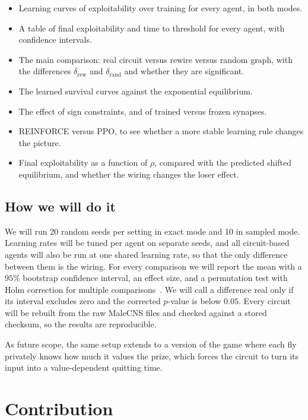 \documentclass{article}
\begin{document}
\begin{itemize}
  \item Learning curves of exploitability over training for every agent, in both modes.
  \item A table of final exploitability and time to threshold for every agent, with confidence intervals.
  \item The main comparison: real circuit versus rewire versus random graph, with the differences $\delta_{\mathrm{rew}}$ and $\delta_{\mathrm{rand}}$ and whether they are significant.
  \item The learned survival curves against the exponential equilibrium.
  \item The effect of sign constraints, and of trained versus frozen synapses.
  \item REINFORCE versus PPO, to see whether a more stable learning rule changes the picture.
  \item Final exploitability as a function of $\rho$, compared with the predicted shifted equilibrium, and whether the wiring changes the loser effect.
\end{itemize}

\subsection{How we will do it}

We will run 20 random seeds per setting in exact mode and 10 in sampled mode. Learning rates will be tuned per agent on separate seeds, and all circuit-based agents will also be run at one shared learning rate, so that the only difference between them is the wiring. For every comparison we will report the mean with a $95\%$ bootstrap confidence interval, an effect size, and a permutation test with Holm correction for multiple comparisons~\cite{holm1979}. We will call a difference real only if its interval excludes zero and the corrected $p$-value is below $0.05$. Every circuit will be rebuilt from the raw MaleCNS files and checked against a stored checksum, so the results are reproducible.

As future scope, the same setup extends to a version of the game where each fly privately knows how much it values the prize, which forces the circuit to turn its input into a value-dependent quitting time.

\section{Contribution}
\label{sec:contrib}
\end{document}
